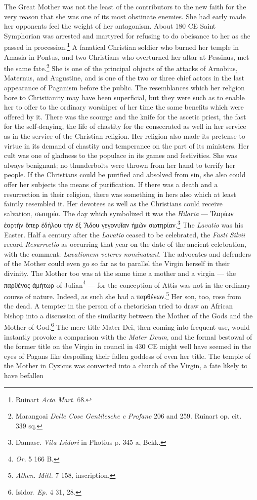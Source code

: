 \documentclass[a4paper, 11pt, oneside, polutonikogreek, french]{article}
\begin{document}
The Great Mother was not the least of the contributors to the new faith for the very reason that she was one of its most obstinate enemies. She had early made her opponents feel the weight of her antagonism. About 180 \textsc{CE} Saint Symphorian was arrested and martyred for refusing to do obeisance to her as she passed in procession.\footnote{Ruinart \emph{Acta Mart.} 68.} A fanatical Christian soldier who burned her temple in Amasia in Pontus, and two Christians who overturned her altar at Pessinus, met the same fate.\footnote{Marangoai \emph{Delle Cose Gentilesche e Profane} 206 and 259. Ruinart op. cit. 339 sq.} She is one of the principal objects of the attacks of Arnobius, Maternus, and Augustine, and is one of the two or three chief actors in the last appearance of Paganism before the public. The resemblances which her religion bore to Christianity may have been superficial, but they were such as to enable her to offer to the ordinary worshiper of her time the same benefits which were offered by it. There was the scourge and the knife for the ascetic priest, the fast for the self-denying, the life of chastity for the consecrated as well in her service as in the service of the Christian religion. Her religion also made its pretense to virtue in its demand of chastity and temperance on the part of its ministers. Her cult was one of gladness to the populace in its games and festivities. She was always benignant; no thunderbolts were thrown from her hand to terrify her people. If the Christians could be purified and absolved from sin, she also could offer her subjects the means of purification. If there was a death and a resurrection in their religion, there was something in hers also which at least faintly resembled it. Her devotees as well as the Christians could receive salvation, σωτηρία. The day which symbolized it was the \emph{Hilaria} --- Ἱλαρίων ἑορτὴν ὅπερ ἐδήλου τὴν ἐξ Ἄδου γεγονυῖαν ἡμῶν σωτηρίαν.\footnote{Damasc. \emph{Vita Isidori} in Photius p. 345 a, Bekk.} The \emph{Lavatio} was his Easter. Half a century after the \emph{Lavatio} ceased to be celebrated, the \emph{Fasti Silvii} record \emph{Resurrectio} as occurring that year on the date of the ancient celebration, with the comment: \emph{Lavationem veteres nominabant}. The advocates and defenders of the Mother could even go so far as to parallel the Virgin herself in their divinity. The Mother too was at the same time a mother and a virgin --- the παρθένος ἀμήτωρ of Julian\footnote{\emph{Or.} 5 166 B.} --- for the conception of Attis was not in the ordinary course of nature. Indeed, as such she had a παρθένων.\footnote{\emph{Athen. Mitt.} 7 158, inscription.} Her son, too, rose from the dead. A tempter in the person of a rhetorician tried to draw an African bishop into a discussion of the similarity between the Mother of the Gods and the Mother of God.\footnote{Isidor. \emph{Ep.} 4 31, 28.} The mere title Mater Dei, then coming into frequent use, would instantly provoke a comparison with the \emph{Mater Deum}, and the formal bestowal of the former title on the Virgin in council in 430 \textsc{CE} might well have seemed in the eyes of Pagans like despoiling their fallen goddess of even her title. The temple of the Mother in Cyzicus was converted into a church of the Virgin, a fate likely to have befallen 
\end{document}
